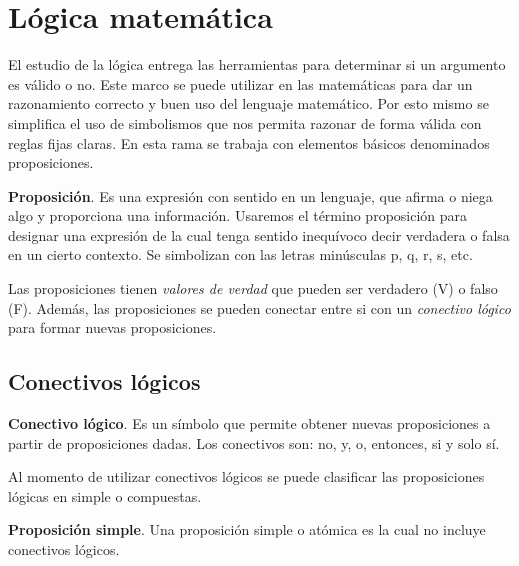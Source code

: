 \chapter{Lógica matemática}
\label{LM}

El estudio de la lógica entrega las herramientas para determinar si un argumento es válido o no. Este marco se puede utilizar en las matemáticas para dar un razonamiento correcto y buen uso del lenguaje matemático. Por esto mismo se simplifica el uso de simbolismos que nos permita razonar de forma válida con reglas fijas claras. En esta rama se trabaja con elementos básicos denominados proposiciones.\\

\begin{mydef}
\textbf{Proposición}. Es una expresión con sentido en un lenguaje, que afirma o niega algo y proporciona una información. Usaremos el término proposición para designar una expresión de la cual tenga sentido inequívoco decir verdadera o falsa en un cierto contexto. Se simbolizan con las letras minúsculas p, q, r, s, etc.
\end{mydef}

Las proposiciones tienen \textit{valores de verdad} que pueden ser verdadero (V) o falso (F). Además, las proposiciones se pueden conectar entre si con un \textit{conectivo lógico} para formar nuevas proposiciones.\\

\section{Conectivos lógicos}

\begin{mydef}
\textbf{Conectivo lógico}. Es un símbolo que permite obtener nuevas proposiciones a partir de proposiciones dadas. Los conectivos son: no, y, o, entonces, si y solo sí.
\end{mydef}

Al momento de utilizar conectivos lógicos se puede clasificar las proposiciones lógicas en simple o compuestas.

\begin{mydef}
\textbf{Proposición simple}. Una proposición simple o atómica es la cual no incluye conectivos lógicos.
\end{mydef}

